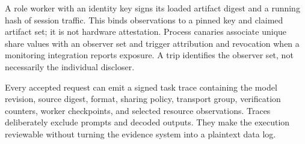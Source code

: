 A role worker with an identity key signs its loaded artifact digest and a running hash of session traffic. This binds observations to a pinned key and claimed artifact set; it is not hardware attestation. Process canaries associate unique share values with an observer set and trigger attribution and revocation when a monitoring integration reports exposure. A trip identifies the observer set, not necessarily the individual discloser.

Every accepted request can emit a signed task trace containing the model revision, source digest, format, sharing policy, transport group, verification counters, worker checkpoints, and selected resource observations. Traces deliberately exclude prompts and decoded outputs. They make the execution reviewable without turning the evidence system into a plaintext data log.
